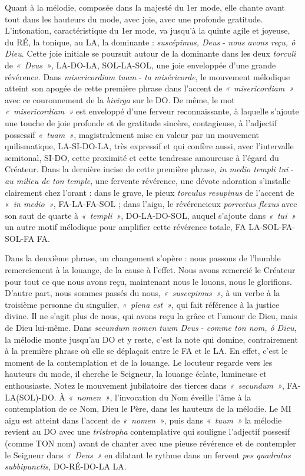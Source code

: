 \documentclass[Session2026.tex]{subfiles}
\begin{document}
Quant à la mélodie, composée dans la majesté du 1er mode, elle chante
avant tout dans les hauteurs du mode, avec joie, avec une profonde
gratitude. L'intonation, caractéristique du 1er mode, va jusqu'à la
quinte agile et joyeuse, du RÉ, la tonique, au LA, la dominante :
\emph{suscépimus, Deus} - \emph{nous avons reçu, ô Dieu}. Cette joie
initiale se poursuit autour de la dominante dans les deux \emph{torculi}
de \emph{«~Deus~»}, LA-DO-LA, SOL-LA-SOL, une joie enveloppée d'une
grande révérence. Dans \emph{misericordiam tuam} - \emph{ta
miséricorde}, le mouvement mélodique atteint son apogée de cette
première phrase dans l'accent de \emph{«~misericordiam~»} avec ce
couronnement de la \emph{bivirga} sur le DO. De même, le mot
\emph{«~misericordiam~»} est enveloppé d'une ferveur reconnaissante, à
laquelle s'ajoute une touche de joie profonde et de gratitude sincère,
contagieuse, à l'adjectif possessif \emph{«~tuam~»}, magistralement mise
en valeur par un mouvement quilismatique, LA-SI-DO-LA, très expressif et
qui confère aussi, avec l'intervalle semitonal, SI-DO, cette proximité
et cette tendresse amoureuse à l'égard du Créateur. Dans la dernière
incise de cette première phrase, \emph{in medio templi tui} - \emph{au
milieu de ton temple}, une fervente révérence, une dévote adoration
s'installe clairement chez l'orant : dans le grave, le pieux
\emph{torculus resupinus} de l'accent de «~\emph{in medio~»},
FA-LA-FA-SOL ; dans l'aigu, le révérencieux \emph{porrectus flexus} avec
son saut de quarte à \emph{«~templi~»}, DO-LA-DO-SOL, auquel s'ajoute
dans \emph{«~tui~»} un autre motif mélodique pour amplifier cette
révérence totale, FA LA-SOL-FA-SOL-FA FA.

Dans la deuxième phrase, un changement s'opère : nous passons de
l'humble remerciement à la louange, de la cause à l'effet. Nous avons
remercié le Créateur pour tout ce que nous avons reçu, maintenant nous
le louons, nous le glorifions. D'autre part, nous sommes passés du nous,
\emph{«~suscepimus~»}, à un verbe à la troisième personne du singulier,
\emph{«~plena est~»}, qui fait référence à la justice divine. Il ne
s'agit plus de nous, qui avons reçu la grâce et l'amour de Dieu, mais de
Dieu lui-même. Dans \emph{secundum nomen tuum Deus} - \emph{comme ton
nom, ô Dieu}, la mélodie monte jusqu'au DO et y reste, c'est la note qui
domine, contrairement à la première phrase où elle se déplaçait entre le
FA et le LA. En effet, c'est le moment de la contemplation et de la
louange. Le locuteur regarde vers les hauteurs du mode, il cherche le
Seigneur, la louange éclate, lumineuse et enthousiaste. Notez le
mouvement jubilatoire des tierces dans \emph{«~secundum~»},
FA-LA(SOL)-DO. À \emph{«~nomen~»}, l'invocation du Nom éveille l'âme à
la contemplation de ce Nom, Dieu le Père, dans les hauteurs de la
mélodie. Le MI aigu est atteint dans l'accent de \emph{«~nomen~»}, puis
dans \emph{«~tuum~»} la mélodie revient au DO avec une \emph{tristropha}
contemplative qui souligne l'adjectif possesif (comme TON nom) avant de
chanter avec une pieuse révérence et de contempler le Seigneur dans
\emph{«~Deus~»} en dilatant le rythme dans un fervent \emph{pes
quadratus subbipunctis}, DO-RÉ-DO-LA LA.
\end{document}
